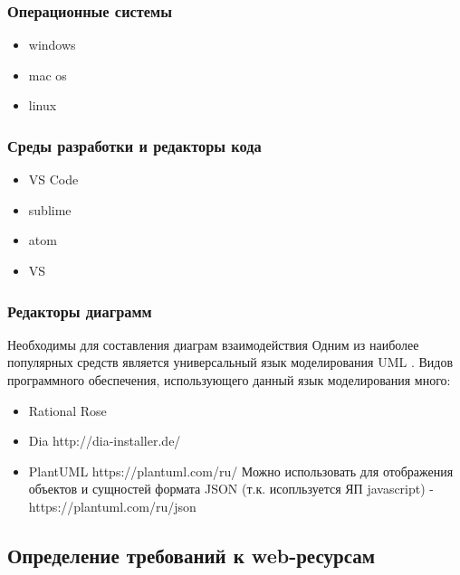     \subsubsection{Операционные системы}                                                        %
        \begin{itemize}
            \item windows
            \item mac os
            \item linux
        \end{itemize}
        
    \subsubsection{Среды разработки и редакторы кода}                                             %
        \begin{itemize}
            \item VS Code
            \item sublime
            \item atom
            \item VS
        \end{itemize}
    
    \subsubsection{Редакторы диаграмм}                                                %
        Необходимы для составления диаграм взаимодействия
        Одним из наиболее популярных средств является универсальный язык моделирования UML \cite{wiki-UML}.
        Видов программного обеспечения, использующего данный язык моделирования много:
        \begin{itemize}
            \item Rational Rose
            \item Dia   http://dia-installer.de/
            \item PlantUML  https://plantuml.com/ru/
            Можно использовать для отображения объектов и сущностей формата JSON (т.к. исопльзуется ЯП javascript) - https://plantuml.com/ru/json
        \end{itemize}

\subsection{Определение требований к web-ресурсам}
    
